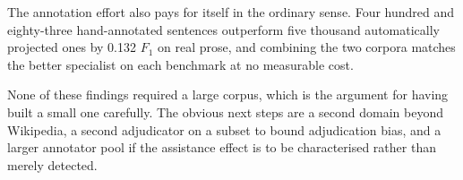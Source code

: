 The annotation effort also pays for itself in the ordinary sense. Four hundred and eighty-three hand-annotated sentences outperform five thousand automatically projected ones by 0.132 $F_1$ on real prose, and combining the two corpora matches the better specialist on each benchmark at no measurable cost.

None of these findings required a large corpus, which is the argument for having built a small one carefully. The obvious next steps are a second domain beyond Wikipedia, a second adjudicator on a subset to bound adjudication bias, and a larger annotator pool if the assistance effect is to be characterised rather than merely detected.
